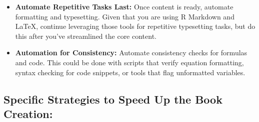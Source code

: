\documentclass[
  12 pt,
  a4paper,
]{book}
\providecommand{\tightlist}{%
  \setlength{\itemsep}{0pt}\setlength{\parskip}{0pt}}
\numberwithin{equation}{section}
\theoremstyle{plain}      %
\theoremstyle{definition} %
\theoremstyle{remark}     %
\theoremstyle{note}         %
\begin{document}
\begin{itemize}
\tightlist
\item
  \textbf{Automate Repetitive Tasks Last:} Once content is ready,
  automate formatting and typesetting. Given that you are using R
  Markdown and LaTeX, continue leveraging those tools for repetitive
  typesetting tasks, but do this after you've streamlined the core
  content.
\item
  \textbf{Automation for Consistency:} Automate consistency checks for
  formulas and code. This could be done with scripts that verify
  equation formatting, syntax checking for code snippets, or tools that
  flag unformatted variables.
\end{itemize}

\hypertarget{specific-strategies-to-speed-up-the-book-creation}{%
\subsection*{\texorpdfstring{\textbf{Specific Strategies to Speed Up the
Book
Creation:}}{Specific Strategies to Speed Up the Book Creation:}}\label{specific-strategies-to-speed-up-the-book-creation}}
\end{document}
